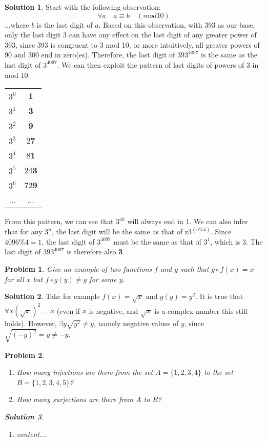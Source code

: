 \documentclass{article}
\newtheorem{problem}{Problem}
\theoremstyle{definition}
\newtheorem*{solution}{Solution}
\begin{document}
\begin{solution}
Start with the following observation:\[\forall a\quad a \equiv b \quad (mod 10)\] ...where $b$ is the last digit of $a$. Based on this observation, with 393 as our base, only the last digit $3$ can have any effect on the last digit of any greater power of 393, since 393 is congruent to 3 mod 10, or more intuitively, all greater powers of 90 and 300 end in zero(es). Therefore, the last digit of $393^{4097}$ is the same as the last digit of $3^{4097}$. We can then exploit the pattern of last digits of powers of 3 in mod 10:
\begin{center}
	\begin{tabular}{c c}
		$3^0$ & \textbf{1} \\
		$3^1$ & \textbf{3} \\
		$3^2$	& \textbf{9} \\
		$3^3$	& 2\textbf{7} \\
		$3^4$	& 8\textbf{1} \\
		$3^5$	& 24\textbf{3} \\
		$3^6$	& 72\textbf{9} \\
		...		& ...
	\end{tabular}
\end{center}
From this pattern, we can see that $3^{4k}$ will always end in 1. We can also infer that for any $3^n$, the last digit will be the same as that of z$3^{(n\%4)}$. Since $4096\%4 = 1$, the last digit of $3^{4097}$ must be the same as that of $3^1$, which is 3. The last digit of $393^{4097}$ is therefore also \textbf{3}
\end{solution}
\begin{problem}
Give an example of two functions $f$ and $g$ such that $g \circ f(x) = x$ for all $x$ but $f \circ g(y) \not= y$ for some $y$.
\end{problem}
\begin{solution}
	Take for example $f(x) = \sqrt{x}$ and $g(y) = y^2$. It is true that $\forall x (\sqrt{x})^2 = x$ (even if $x$ is negative, and $\sqrt{x}$ is a complex number this still holds). However, $\exists y \sqrt{y^2} \not= y$, namely negative values of $y$, since $\sqrt{(-y)^2} = y \not= -y$. 
\end{solution}
\begin{problem}
	\renewcommand{\theenumi}{\alph{enumi}}
	\begin{enumerate}
		\item How many injections are there from the set $A = \{1,2,3,4\}$ to the set $B = \{1,2,3,4,5\}$?
		\item How many surjections are there from $A$ to $B$?
	\end{enumerate}
	\begin{solution}
		\[\]
		\begin{enumerate}
			\item content...
		\end{enumerate}
	\end{solution}
\end{problem}
\end{document}
